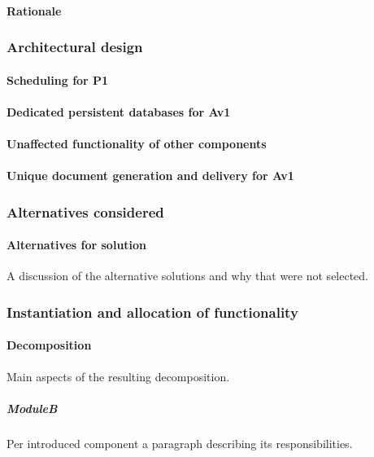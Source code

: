 \documentclass[a4paper,10pt]{article}
\begin{document}
\paragraph{Rationale}

\subsubsection{Architectural design}
\paragraph{Scheduling for P1}


\paragraph{Dedicated persistent databases for Av1}


\paragraph{Unaffected functionality of other components}


\paragraph{Unique document generation and delivery for Av1}



\subsubsection*{Alternatives considered}
\paragraph{Alternatives for solution}
A discussion of the alternative solutions and why that were not selected.

\subsubsection{Instantiation and allocation of functionality}
\paragraph{Decomposition}
Main aspects of the resulting decomposition.

\subparagraph{ModuleB}
Per introduced component a paragraph describing its responsibilities.
\end{document}
